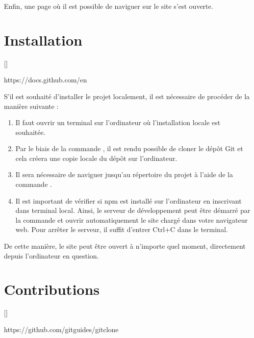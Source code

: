 \documentclass[a4,10pt,french]{sphinxmanual}
\begin{document}
\sphinxAtStartPar
Enfin, une page où il est possible de naviguer sur le site s’est ouverte.


\section{Installation}
\label{\detokenize{chapitre-02:installation}}
\sphinxAtStartPar
{[}{]}
 \sphinxstepexplicit %
\begin{footnote}[2]\label{\thesphinxscope.2}%
\sphinxAtStartFootnote
https://docs.github.com/en
%
\end{footnote}

\sphinxAtStartPar
S’il est souhaité d’installer le projet localement, il est nécessaire de procéder de la manière suivante :
\begin{enumerate}
%
\item {} 
\sphinxAtStartPar
Il faut ouvrir un terminal sur l’ordinateur où l’installation locale est souhaitée.

\item {} 
\sphinxAtStartPar
Par le biais de la commande , il est rendu possible de cloner le dépôt Git et cela créera une copie locale du dépôt sur l’ordinateur.

\item {} 
\sphinxAtStartPar
Il sera nécessaire de naviguer jusqu’au répertoire du projet à l’aide de la commande .

\item {} 
\sphinxAtStartPar
Il est important de vérifier si npm est installé sur l’ordinateur en inscrivant  dans terminal local. Ainsi, le serveur de développement peut être démarré par la commande  et ouvrir automatiquement le site chargé dans votre navigateur web. Pour arrêter le serveur, il suffit d’entrer Ctrl+C dans le terminal.

\end{enumerate}

\sphinxAtStartPar
De cette manière, le site peut être ouvert à n’importe quel moment, directement depuis l’ordinateur en question.


\section{Contributions}
\label{\detokenize{chapitre-02:contributions}}
\sphinxAtStartPar
{[}{]}
 \sphinxstepexplicit %
\begin{footnote}[3]\label{\thesphinxscope.3}%
\sphinxAtStartFootnote
https://github.com/git\sphinxhyphen{}guides/git\sphinxhyphen{}clone
%
\end{footnote}
\end{document}
